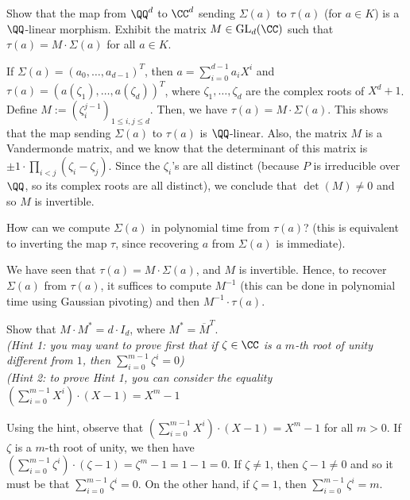 \documentclass[11pt]{exam}
\theoremstyle{definition}
\begin{document}
\begin{questions}
\question Show that the map from $\QQ^d$ to $\CC^d$ sending $\Sigma(a)$ to $\tau(a)$ (for $a \in K$) is a $\QQ$-linear morphism. Exhibit the matrix $M \in \mathrm{GL}_d(\CC)$ such that $\tau(a) = M \cdot \Sigma(a)$ for all $a \in K$.

\begin{solution}
If $\Sigma(a) = (a_0, \dots, a_{d-1})^T$, then $a = \sum_{i=0}^{d-1} a_i X^i$ and $\tau(a) = (a(\zeta_1), \dots, a(\zeta_d))^T$, where $\zeta_1, \dots, \zeta_d$ are the complex roots of $X^d+1$.
Define $M := (\zeta_i^{j-1})_{1\leq i,j\leq d}$. Then, we have $\tau(a) = M \cdot \Sigma(a)$. This shows that the map sending $\Sigma(a)$ to $\tau(a)$ is $\QQ$-linear.
Also, the matrix $M$ is a Vandermonde matrix, and we know that the determinant of this matrix is $\pm1 \cdot \prod_{i<j} (\zeta_i-\zeta_j)$. Since the $\zeta_i$'s are all distinct (because $P$ is irreducible over $\QQ$, so its complex roots are all distinct), we conclude that $\det(M) \neq 0$ and so $M$ is invertible.
\end{solution}

\question How can we compute $\Sigma(a)$ in polynomial time from $\tau(a)$? (this is equivalent to inverting the map $\tau$, since recovering $a$ from $\Sigma(a)$ is immediate).

\begin{solution}
We have seen that $\tau(a) = M \cdot \Sigma(a)$, and $M$ is invertible. Hence, to recover $\Sigma(a)$ from $\tau(a)$, it suffices to compute $M^{-1} $ (this can be done in polynomial time using Gaussian pivoting) and then $M^{-1} \cdot \tau(a)$.
\end{solution}

\question Show that $M \cdot M^* = d \cdot I_d$, where $M^* = \overline{M}^T$.\\
\textit{\color{gray}(Hint 1: you may want to prove first that if $\zeta \in \CC$ is a $m$-th root of unity different from $1$, then $\sum_{i = 0}^{m-1} \zeta^i = 0$)} \\
\textit{\color{gray}(Hint 2: to prove Hint 1, you can consider the equality $(\sum_{i = 0}^{m-1} X^i) \cdot (X-1) = X^m-1$}

\begin{solution}
Using the hint, observe that $(\sum_{i = 0}^{m-1} X^i) \cdot (X-1) = X^m-1$ for all $m > 0$. If $\zeta$ is a $m$-th root of unity, we then have $(\sum_{i = 0}^{m-1} \zeta^i) \cdot (\zeta-1) = \zeta^m-1 = 1-1 = 0$. If $\zeta \neq 1$, then $\zeta-1 \neq 0$ and so it must be that $\sum_{i = 0}^{m-1} \zeta^i = 0$. On the other hand, if $\zeta = 1$, then $\sum_{i = 0}^{m-1} \zeta^i = m$.


\end{solution}
\end{questions}
\end{document}
